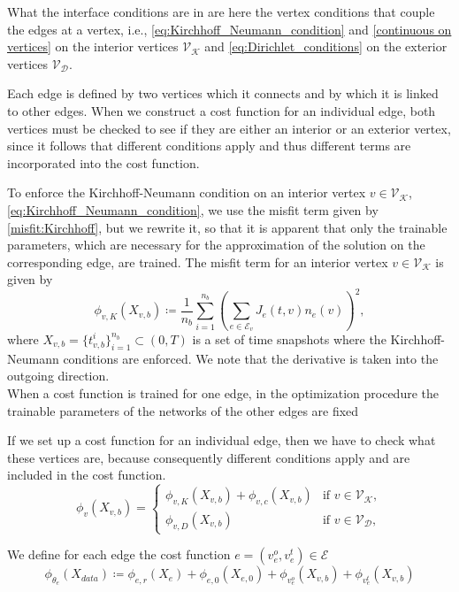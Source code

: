 What the interface conditions are in \cite{JagtapKharazmiKarniadakis:2020} are here the vertex conditions that couple the edges at a vertex, i.e., \cref{eq:Kirchhoff_Neumann_condition} and \cref{continuous on vertices} on the interior vertices $\mathcal{V}_\mathcal{K}$ and \cref{eq:Dirichlet_conditions} on the exterior vertices $\mathcal{V}_\mathcal{D}$. 

Each edge is defined by two vertices which it connects and by which it is linked to other edges. When we construct a cost function for an individual edge, both vertices must be checked to see if they are either an interior or an exterior vertex, since it follows that different conditions apply and thus different terms are incorporated into the cost function. 

To enforce the Kirchhoff-Neumann condition on an interior vertex $v \in \mathcal{V}_\mathcal{K}$, \cref{eq:Kirchhoff_Neumann_condition}, we use the misfit term given by \cref{misfit:Kirchhoff}, but we rewrite it, so that it is apparent that only the trainable parameters, which are necessary for the approximation of the solution on the corresponding edge, are trained. The misfit term for an interior vertex $v \in \mathcal{V}_\mathcal{K}$ is given by
\begin{equation} 
    \label{misfit:Kirchhoff.}
    \phi_{v,K}  \left( X_{v,b} \right) \coloneqq \frac{1}{n_b} \sum_{i=1}^{n_b}  \left( \sum_{e\in \mathcal{E}_v} J_e(t,v) n_e (v) \right)^2, 
\end{equation} 
where $X_{v,b} = \{t_{v,b}^i\}_{i=1}^{n_b} \subset \left( 0,T \right)$ is a set of time snapshots where the Kirchhoff-Neumann conditions are enforced. We note that the derivative is taken into the outgoing direction. \\

When a cost function is trained for one edge, in the optimization procedure the trainable parameters of the networks of the other edges are fixed



If we set up a cost function for an individual edge, then we have to check what these vertices are, because consequently different conditions apply and are included in the cost function. 
\begin{equation}
    \label{vertex funcions}
    \phi_{v}(X_{v,b}) = \begin{cases} \phi_{v,K}  \left( X_{v,b} \right) +  \phi_{v,c}  \left( X_{v,b} \right)& \text{if } v \in \mathcal{V}_{\mathcal{K}}, \\ \phi_{v,D}  \left( X_{v,b} \right) & \text{if } v \in \mathcal{V}_{\mathcal{D}}, \end{cases}
\end{equation}


We define for each edge the cost function $e = (v^{o}_e, v^{t}_e) \in \mathcal{E}$
\begin{equation}
    \label{eq:cost:2}
    \phi_{\theta_e} \left( X_{data} \right) \coloneqq \phi_{e,r}  \left( X_e \right) + \phi_{e,0}  \left( X_{e,0} \right) + \phi_{v^{o}_e}(X_{v,b}) + \phi_{v^{t}_e}(X_{v,b})
\end{equation}